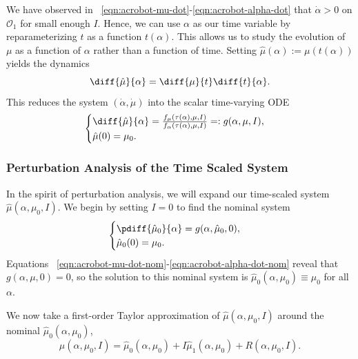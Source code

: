 We have observed in ~\eqref{eqn:acrobot-mu-dot}-\eqref{eqn:acrobot-alpha-dot}
that \(\dot{\alpha} > 0\) on \(\mathcal{O}_1\) for small enough \(I\). 
Hence, we can use \(\alpha\) as our time variable by reparameterizing \(t\) as a
function \(t(\alpha)\).
This allows us to study the evolution of \(\mu\) as a function of \(\alpha\)
rather than a function of time.
Setting \(\hat{\mu}(\alpha) := \mu(t(\alpha))\) yields the dynamics
\[
    \diff{\hat{\mu}}{\alpha} = 
    \diff{\mu}{t} \diff{t}{\alpha}
    .
\] 
This reduces the system \((\dot{\alpha},\dot{\mu})\) into the scalar
time-varying ODE 
\begin{equation}\label{eqn:muhat-dot}
    \begin{cases}
        \diff{\hat{\mu}}{\alpha} 
        = \frac{f_\mu(\tau(\alpha),\mu,I)}{f_\alpha(\tau(\alpha),\mu,I)}
        =: g(\alpha,\mu,I)
        , \\
        \hat{\mu}(0) = \mu_0
        .
    \end{cases}
\end{equation}

\subsubsection*{Perturbation Analysis of the Time Scaled System}

In the spirit of perturbation analysis, we will expand our time-scaled system
\(\hat{\mu}(\alpha,\mu_0,I)\).
We begin by setting \(I = 0\) to find the nominal system
\[
\begin{cases}
    \pdiff{\hat{\mu}_0}{\alpha} = g(\alpha,\hat{\mu}_0,0)
    , \\
    \hat{\mu}_0(0) = \mu_0
   .
\end{cases}
\]
Equations ~\eqref{eqn:acrobot-mu-dot-nom}-\eqref{eqn:acrobot-alpha-dot-nom}
reveal that \(g(\alpha,\mu,0) = 0\),
so the solution to this nominal system is 
\(\hat{\mu}_0(\alpha,\mu_0) \equiv \mu_0\) for all \(\alpha\).

We now take a first-order Taylor approximation of \(\hat{\mu}(\alpha,\mu_0,I)\)
around the nominal \(\hat{\mu}_0(\alpha,\mu_0)\),
\begin{equation}\label{eqn:acrobot-muhat-approx}
    \hat{\mu}(\alpha,\mu_0,I) = \hat{\mu}_0(\alpha,\mu_0) + I
    \hat{\mu}_1(\alpha,\mu_0)
    + R(\alpha,\mu_0,I)
    .
\end{equation}

